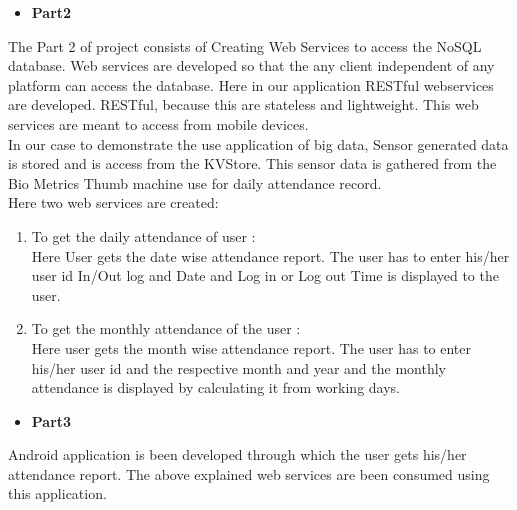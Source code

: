 \begin{itemize}
  \item \textbf{Part2}
\end{itemize}
\hspace*{0.7in} The Part 2 of project consists of Creating Web Services to access the NoSQL database. Web services are developed so that the any client independent of any platform can access the database. Here in our application RESTful webservices are developed. RESTful, because this are stateless and lightweight. This web services are meant to access from mobile devices. \\
\hspace*{0.7in}	In our case to demonstrate the use application of big data, Sensor generated data is stored and is access from the KVStore. This sensor data is gathered from the Bio Metrics Thumb machine use for daily attendance record. \\
\hspace*{0.7in}	Here two web services are created:
\begin{enumerate}
    \item To get the daily attendance of user : \\
\hspace*{0.7in} Here User gets the date wise attendance report. The user has to enter his/her user id In/Out log and Date and Log in or Log out Time is displayed to the user.

    \item To get the monthly attendance of the user : \\
\hspace*{0.7in} Here user gets the month wise attendance report. The user has to enter his/her user id and the respective month and year and the monthly attendance is displayed by calculating it from working days.
\end{enumerate}

\begin{itemize}
  \item \textbf{Part3}
\end{itemize}
\hspace*{0.7in} Android application is been developed through which the user gets his/her attendance report. The above explained web services are been consumed using this application.


